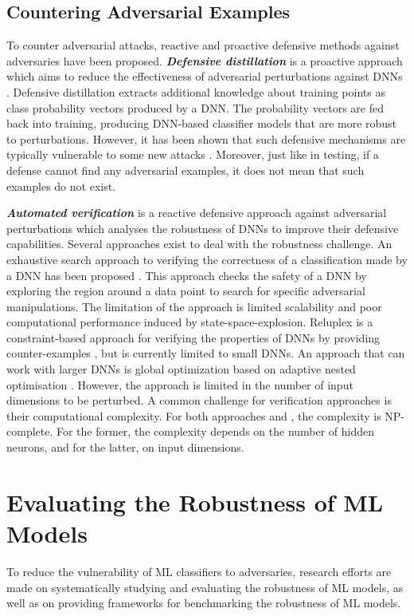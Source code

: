 \documentclass[letterpaper]{article} %
\begin{document}
\subsection{Countering Adversarial Examples}
To counter adversarial attacks, reactive and proactive defensive methods against adversaries have been proposed. \textit{\textbf{Defensive distillation}} is a proactive approach which aims to reduce the effectiveness of adversarial perturbations against DNNs \cite{Papernot2016}. Defensive distillation extracts additional knowledge about training points as class probability vectors produced by a DNN. The probability vectors are fed back into training, producing DNN-based classifier models that are more robust to perturbations. However, it has been shown that such defensive mechanisms are typically vulnerable to some new attacks \cite{Carlini2017}. Moreover, just like in testing, if a defense cannot find any adversarial examples, it does not mean that such examples do not exist.

\textit{\textbf{Automated verification}} is a reactive defensive approach against adversarial perturbations which analyses the robustness of DNNs to improve their defensive capabilities. Several approaches exist to deal with the robustness challenge. An exhaustive search approach to verifying the correctness of a classification made by a DNN has been proposed \cite{Huang2017}. This approach checks the safety of a DNN by exploring the region around a data point to search for specific adversarial manipulations. The limitation of the approach is limited scalability and poor computational performance induced by state-space-explosion. Reluplex is a constraint-based approach for verifying the properties of DNNs by providing counter-examples \cite{Katz2017}, but is currently limited to small DNNs. An approach that can work with larger DNNs is global optimization based on adaptive nested optimisation \cite{Ruan2018}. However, the approach is limited in the number of input dimensions to be perturbed. A common challenge for verification approaches is their computational complexity. For both approaches \cite{Katz2017} and \cite{Ruan2018}, the complexity is NP-complete. For the former, the complexity depends on the number of hidden neurons, and for the latter, on input dimensions. 

\section{Evaluating the Robustness of ML Models}
To reduce the vulnerability of ML classifiers to adversaries, research efforts are made on systematically studying and evaluating the robustness of ML models, as well as on providing frameworks for benchmarking the robustness of ML models.
\end{document}
